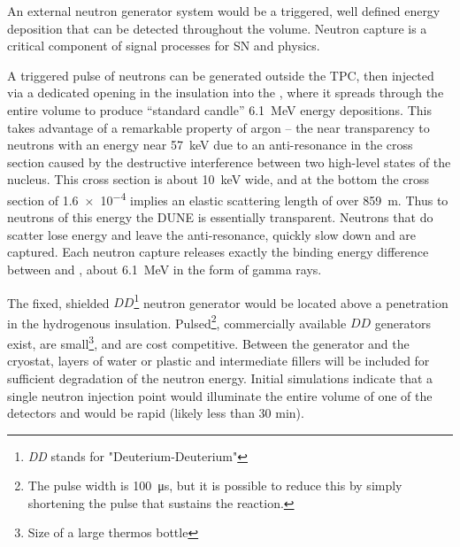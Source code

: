 An external neutron generator system would be a triggered, well defined energy deposition that can be detected throughout the volume. Neutron capture is a critical component of signal processes for SN and  physics. 

A triggered pulse of neutrons can be generated outside the TPC, then injected via a dedicated opening in the insulation into the , where it spreads through the entire volume to produce ``standard candle'' \SI{6.1}{\MeV} energy depositions. This takes advantage of a remarkable property of argon -- the near transparency to neutrons with an energy near \SI{57}{\keV} due to an anti-resonance in the cross section caused by the destructive interference between two high-level states of the  nucleus. This cross section is about \SI{10}{\keV} wide, and at the bottom the cross section of \num{1.6e-4} implies an elastic scattering length of over \SI{859}{\m}. Thus to neutrons of this energy the DUNE  is essentially transparent.
Neutrons that do scatter lose energy and leave the anti-resonance,
quickly slow down and are captured. Each neutron capture releases exactly the binding energy difference between  and , about \SI{6.1}{\MeV} in the form of gamma rays.  



The fixed, shielded $DD$\footnote{{\it DD} stands for "Deuterium-Deuterium"} neutron generator would be located above a penetration in the hydrogenous insulation. Pulsed\footnote{The pulse width is \SI{100}{\micro\s}, but it is possible to reduce this by simply shortening the  pulse that sustains the reaction.}, commercially available $DD$ generators exist, are small\footnote{Size of a large thermos bottle}, and are cost competitive. Between the generator and the cryostat, layers of water or plastic and intermediate fillers will be included for sufficient degradation of the neutron energy. Initial simulations indicate that a single neutron injection point would illuminate the entire volume of one of the  detectors and would be rapid (likely less than 30 min). 

